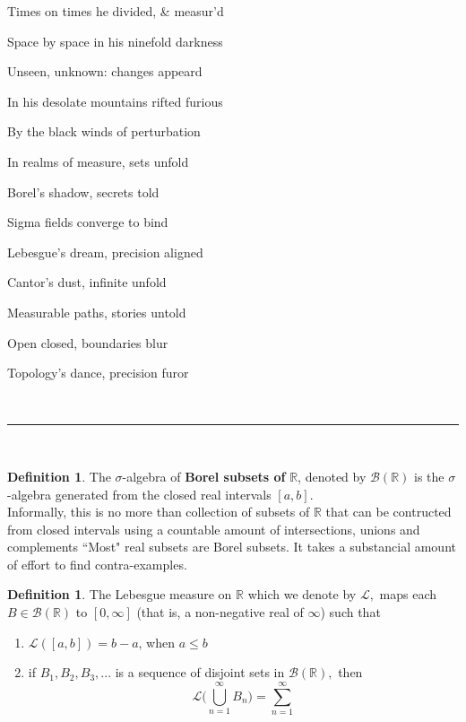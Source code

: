 \documentclass[reqno,a4paper,12pt]{amsart}%
\numberwithin{equation}{section}
\theoremstyle{definition}
\newtheorem{definition}[theorem]{Definition}
\newcommand{\Rr}{{\mathbb{R}}}
\begin{document}
\begin{center}	

Times on times he divided, \& measur'd 

Space by space in his ninefold darkness 

Unseen, unknown: changes appeard 

In his desolate mountains rifted furious 

By the black winds of perturbation

In realms of measure, sets unfold

Borel's shadow, secrets told

Sigma fields converge to bind

Lebesgue's dream, precision aligned

Cantor's dust, infinite unfold

Measurable paths, stories untold

Open closed, boundaries blur

Topology's dance, precision furor


\end{center}

\

\begin{center}
	\par\noindent\rule{200pt}{0.1pt}
\end{center}	
	
\
	

\begin{definition}
	The $\sigma$-algebra of \textbf{Borel subsets of} $\Rr$, denoted by $\mathcal{B}(\Rr)$ is the $\sigma$-algebra generated from the closed real intervals $[a,b].$ \\
	Informally, this is no more than collection of subsets of $\Rr$ that can be contructed from closed intervals using a countable amount of intersections, unions and complements
	``Most" real subsets are Borel subsets. It takes a substancial amount of effort to find contra-examples.
\end{definition}

\begin{definition}
	The Lebesgue measure on $\Rr$ which we denote by $\mathcal{L},$ maps each $B \in \mathcal{B}(\Rr)$ to $[0, \infty]$ (that is, a non-negative real of $\infty$) such that
	\begin{enumerate}
		\item $\mathcal{L}([a,b])= b-a$, when $a\leq b$
		\item if $B_1, B_2, B_3,...$ is a sequence of disjoint sets in $\mathcal{B}(\Rr),$ then $$\mathcal{L}\Bigg(\bigcup_{n=1}^\infty B_n\Bigg)= \sum_{n=1}^\infty $$
	\end{enumerate}
\end{definition}
\end{document}
